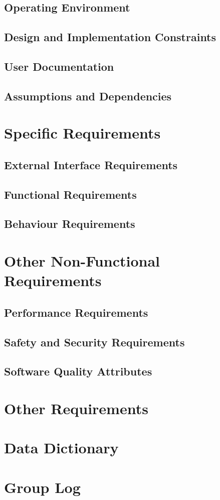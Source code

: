 \documentclass{report}
\begin{document}
\section{Operating Environment}
\section{Design and Implementation Constraints}
\section{User Documentation}
\section{Assumptions and Dependencies}

\chapter{Specific Requirements}
\section{External Interface Requirements}
\section{Functional Requirements}
\section{Behaviour Requirements}

\chapter{Other Non-Functional Requirements}
\section{Performance Requirements}
\section{Safety and Security Requirements}
\section{Software Quality Attributes}

\chapter{Other Requirements}

\begin{appendices}
    \chapter{Data Dictionary}
    \chapter{Group Log}
\end{appendices}
\end{document}
